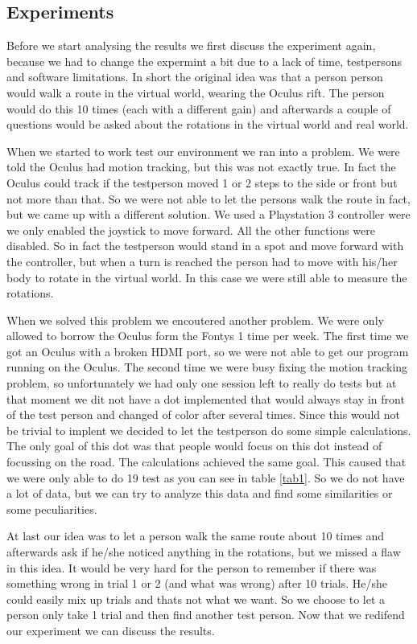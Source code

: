 \subsection{Experiments}
Before we start analysing the results we first discuss the experiment again, because we had to change the expermint a bit due to a lack of time, testpersons and software limitations. 
In short the original idea was that a person person would walk a route in the virtual world, wearing the Oculus rift. 
The person would do this 10 times (each with a different gain) and afterwards a couple of questions would be asked about the rotations in the virtual world and real world. 

When we started to work test our environment we ran into a problem. 
We were told the Oculus had motion tracking, but this was not exactly true. 
In fact the Oculus could track if the testperson moved 1 or 2 steps to the side or front but not more than that. 
So we were not able to let the persons walk the route in fact, but we came up with a different solution. 
We used a Playstation 3 controller were we only enabled the joystick to move forward. 
All the other functions were disabled. 
So in fact the testperson would stand in a spot and move forward with the controller, but when a turn is reached the person had to move with his/her body to rotate in the virtual world. 
In this case we were still able to measure the rotations.

When we solved this problem we encoutered another problem. 
We were only allowed to borrow the Oculus form the Fontys 1 time per week. 
The first time we got an Oculus with a broken HDMI port, so we were not able to get our program running on the Oculus. 
The second time we were busy fixing the motion tracking problem, so unfortunately we had only one session left to really do tests but at that moment we dit not have a dot implemented that would always stay in front of the test person and changed of color after several times. 
Since this would not be trivial to implent we decided to let the testperson do some simple calculations. 
The only goal of this dot was that people would focus on this dot instead of focussing on the road. 
The calculations achieved the same goal. 
This caused that we were only able to do 19 test as you can see in table \ref{tab1}. 
So we do not have a lot of data, but we can try to analyze this data and find some similarities or some peculiarities.

At last our idea was to let a person walk the same route about 10 times and afterwards ask if he/she noticed anything in the rotations, but we missed a flaw in this idea. 
It would be very hard for the person to remember if there was something wrong in trial 1 or 2 (and what was wrong) after 10 trials. 
He/she could easily mix up trials and thats not what we want. 
So we choose to let a person only take 1 trial and then find another test person. Now that we redifend our experiment we can discuss the results.

